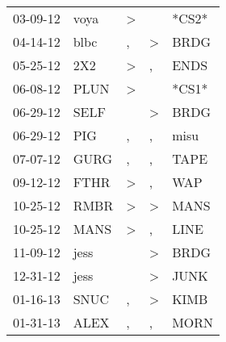 \begin{supertabular}{p{0.07\textwidth}p{0.06\textwidth}p{0.02\textwidth}p{0.02\textwidth}p{0.06\textwidth}}
          03-09-12\textsuperscript{} &           voya\textsuperscript{} &     \textgreater &                  &                            *CS2* \\
          04-14-12\textsuperscript{} &           blbc\textsuperscript{} &                , &     \textgreater &           BRDG\textsuperscript{} \\
          05-25-12\textsuperscript{} &            2X2\textsuperscript{} &     \textgreater &                , &           ENDS\textsuperscript{} \\
          06-08-12\textsuperscript{} &           PLUN\textsuperscript{} &     \textgreater &                  &                            *CS1* \\
          06-29-12\textsuperscript{} &           SELF\textsuperscript{} &                  &     \textgreater &           BRDG\textsuperscript{} \\
          06-29-12\textsuperscript{} &            PIG\textsuperscript{} &                , &                , &           misu\textsuperscript{} \\
          07-07-12\textsuperscript{} &           GURG\textsuperscript{} &                , &                , &           TAPE\textsuperscript{} \\
          09-12-12\textsuperscript{} &           FTHR\textsuperscript{} &     \textgreater &                , &            WAP\textsuperscript{} \\
          10-25-12\textsuperscript{} &           RMBR\textsuperscript{} &     \textgreater &     \textgreater &           MANS\textsuperscript{} \\
          10-25-12\textsuperscript{} &           MANS\textsuperscript{} &     \textgreater &                , &           LINE\textsuperscript{} \\
          11-09-12\textsuperscript{} &           jess\textsuperscript{} &                  &     \textgreater &           BRDG\textsuperscript{} \\
          12-31-12\textsuperscript{} &           jess\textsuperscript{} &                  &     \textgreater &           JUNK\textsuperscript{} \\
          01-16-13\textsuperscript{} &           SNUC\textsuperscript{} &                , &     \textgreater &           KIMB\textsuperscript{} \\
          01-31-13\textsuperscript{} &           ALEX\textsuperscript{} &                , &                , &           MORN\textsuperscript{} \\

\end{supertabular}
